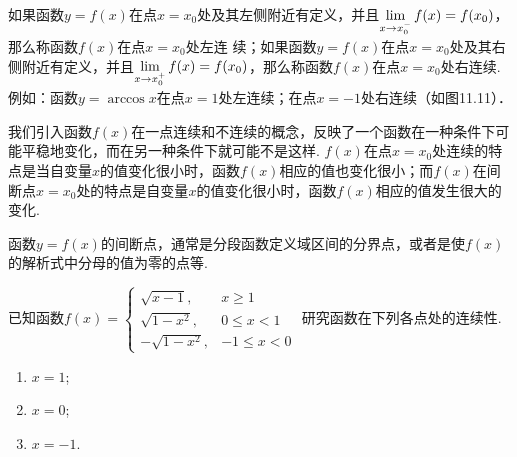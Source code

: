 如果函数$y=f(x)$在点$x=x_0$处及其左侧附近有定义，并且$\lim\limits_{x\to x^-_0}f(x)=f(x_0)$，那么称函数$f(x)$在点$x=x_0$处左连
续；如果函数$y=f(x)$在点$x=x_0$处及其右侧附近有定义，并且$\lim\limits_{x\to x^+_0}f(x)=f(x_0)$，那么称函数$f(x)$在点$x=x_0$处右连续.
例如：函数$y=\arccos x$在点$x=1$处左连续；在点$x=-1$处右连续（如图11.11）．

我们引入函数$f(x)$在一点连续和不连续的概念，反映了一个函数在一种条件下可能平稳地变化，而在另一种条件下就可能不是这样. $f(x)$在点$x=x_0$处连续的特点是当自变量$x$的值变化很小时，函数$f(x)$相应的值也变化很小；而$f(x)$在间断点$x=x_0$处的特点是自变量$x$的值变化很小时，函数$f(x)$相应的值发生很大的变化.

函数$y=f(x)$的间断点，通常是分段函数定义域区间的分界点，或者是使$f(x)$的解析式中分母的值为零的点等.

\begin{example}
已知函数$f(x)=\begin{cases}
    \sqrt{x-1},& x\geqslant1\\
    \sqrt{1-x^{2}},& 0\leqslant x<1\\
    -\sqrt{1-x^{2}},& -1\leqslant x<0
\end{cases}$
研究函数在下列各点处的连续性. 
\begin{multicols}{3}
\begin{enumerate}[(1)]
    \item $x=1$;
    \item $x=0$;
    \item $x=-1$.
\end{enumerate}
\end{multicols}
\end{example}

